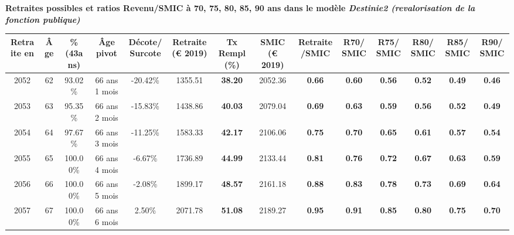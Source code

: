  \vspace{0.1cm} 
{\bf \noindent Retraites possibles et ratios Revenu/SMIC à 70, 75, 80, 85, 90 ans dans le modèle \emph{Destinie2 (revalorisation de la fonction publique)}}  
 
\begin{adjustbox}{max width=\textwidth} 
\begin{tabular}[htb]{|c|c||c|c|c||c|c||c|c||c|c|c|c|c|} 
\hline 
 Retraite en &  Âge &  \%(43ans) &  Âge pivot &  Décote/Surcote &  Retraite (\euro{} 2019) &  Tx Rempl(\%) &  SMIC (\euro{} 2019) &  Retraite/SMIC &  R70/SMIC &  R75/SMIC &  R80/SMIC &  R85/SMIC &  R90/SMIC \\ 
\hline \hline 
 2052 &  62 &  93.02\% &  66 ans 1 mois &  -20.42\% &  1355.51 &  {\bf 38.20} &  2052.36 &  {\bf {\color{red} 0.66}} &  {\bf {\color{red} 0.60}} &  {\bf {\color{red} 0.56}} &  {\bf {\color{red} 0.52}} &  {\bf {\color{red} 0.49}} &  {\bf {\color{red} 0.46}} \\ 
\hline 
 2053 &  63 &  95.35\% &  66 ans 2 mois &  -15.83\% &  1438.86 &  {\bf 40.03} &  2079.04 &  {\bf {\color{red} 0.69}} &  {\bf {\color{red} 0.63}} &  {\bf {\color{red} 0.59}} &  {\bf {\color{red} 0.56}} &  {\bf {\color{red} 0.52}} &  {\bf {\color{red} 0.49}} \\ 
\hline 
 2054 &  64 &  97.67\% &  66 ans 3 mois &  -11.25\% &  1583.33 &  {\bf 42.17} &  2106.06 &  {\bf {\color{red} 0.75}} &  {\bf {\color{red} 0.70}} &  {\bf {\color{red} 0.65}} &  {\bf {\color{red} 0.61}} &  {\bf {\color{red} 0.57}} &  {\bf {\color{red} 0.54}} \\ 
\hline 
 2055 &  65 &  100.00\% &  66 ans 4 mois &  -6.67\% &  1736.89 &  {\bf 44.99} &  2133.44 &  {\bf {\color{red} 0.81}} &  {\bf {\color{red} 0.76}} &  {\bf {\color{red} 0.72}} &  {\bf {\color{red} 0.67}} &  {\bf {\color{red} 0.63}} &  {\bf {\color{red} 0.59}} \\ 
\hline 
 2056 &  66 &  100.00\% &  66 ans 5 mois &  -2.08\% &  1899.17 &  {\bf 48.57} &  2161.18 &  {\bf {\color{red} 0.88}} &  {\bf {\color{red} 0.83}} &  {\bf {\color{red} 0.78}} &  {\bf {\color{red} 0.73}} &  {\bf {\color{red} 0.69}} &  {\bf {\color{red} 0.64}} \\ 
\hline 
 2057 &  67 &  100.00\% &  66 ans 6 mois &  2.50\% &  2071.78 &  {\bf 51.08} &  2189.27 &  {\bf {\color{red} 0.95}} &  {\bf {\color{red} 0.91}} &  {\bf {\color{red} 0.85}} &  {\bf {\color{red} 0.80}} &  {\bf {\color{red} 0.75}} &  {\bf {\color{red} 0.70}} \\ 
\hline 
\hline 
\end{tabular} 
\end{adjustbox} 
 
